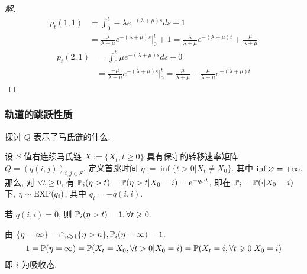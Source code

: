 \begin{proof}[解]
\[    \]
    \[
    \begin{aligned}
        p_t(1,1)&=\int_0^t -\lambda e^{-(\lambda +\mu)s}ds+1\\
        &=\frac{\lambda}{\lambda +\mu}e^{-(\lambda+\mu)s}\bigg|_0^t+1=\frac{\lambda}{\lambda+\mu}e^{-(\lambda+\mu)t}+\frac{\mu}{\lambda+\mu}
    \end{aligned}
    \]
    \[
    \begin{aligned}
        p_t(2,1)&=\int_0^t \mu e^{-(\lambda +\mu)s}ds+0\\
        &=\frac{-\mu}{\lambda +\mu}e^{-(\lambda+\mu)s}\bigg|_0^t=\frac{\mu}{\lambda+\mu}-\frac{\mu}{\lambda+\mu}e^{-(\lambda+\mu)t}
    \end{aligned}
    \]
\end{proof}

\subsubsection{轨道的跳跃性质}

探讨 $Q$ 表示了马氏链的什么.

\begin{theorem}\label{thm:p127-thm5}
    设 $S$ 值右连续马氏链 $X:=\{X_t,t\geq 0\}$ 具有保守的转移速率矩阵 $Q=(q(i,j))_{i,j\in S}$. 定义首跳时间 $\eta:=\inf \{t>0|X_t\neq X_0\}$. 其中 $\inf \varnothing=+\infty$. 那么, 对 $\forall t\geq 0$, 有 $\mathbb{P}_i(\eta>t)=\mathbb{P}(\eta>t|X_0=i)=e^{-q_i\cdot t}$, 即在 $\mathbb{P}_i=\mathbb{P}(\cdot|X_0=i)$ 下, $\eta\sim \operatorname{EXP}(q_i)$, 其中 $q_i=-q(i,i)$.
\end{theorem}

\begin{corollary}
    若 $q(i,i)=0$, 则 $\mathbb{P}_i(\eta>t)=1, \forall t\geqslant 0$. 
\end{corollary}
由 $\{\eta=\infty\}=\cap_{n\geqslant 1}\{\eta >n\}, \mathbb{P}_i(\eta=\infty)=1$.
\[
    1=\mathbb{P}(\eta=\infty)=\mathbb{P}(X_t=X_0,\forall t>0|X_0=i)=\mathbb{P}(X_t=i,\forall t\geqslant 0|X_0=i)
\]
即 $i$ 为吸收态.


